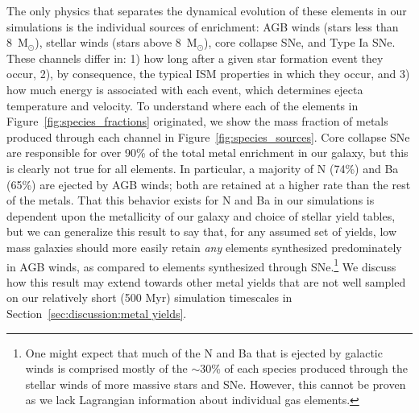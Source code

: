 \documentclass[twocolumn]{aastex61}
\begin{document}
The only physics that separates the dynamical evolution of these elements in our simulations is the individual sources of enrichment: AGB winds (stars less than 8~M$_{\odot}$), stellar winds (stars above 8~M$_{\odot}$), core collapse SNe, and Type Ia SNe. These channels differ in: 1) how long after a given star formation event they occur, 2), by consequence, the typical ISM properties in which they occur, and 3) how much energy is associated with each event, which determines ejecta temperature and velocity. To understand where each of the elements in Figure~\ref{fig:species_fractions} originated, we show the mass fraction of metals produced through each channel in Figure~\ref{fig:species_sources}. Core collapse SNe are responsible for over 90\% of the total metal enrichment in our galaxy, but this is clearly not true for all elements. In particular, a majority of N (74\%) and Ba (65\%) are ejected by AGB winds; both are retained at a higher rate than the rest of the metals. That this behavior exists for N and Ba in our simulations is dependent upon the metallicity of our galaxy and choice of stellar yield tables, but we can generalize this result to say that, for any assumed set of yields, low mass galaxies should more easily retain \textit{any} elements synthesized predominately in AGB winds, as compared to elements synthesized through SNe.\footnote{One might expect that much of the N and Ba that is ejected by galactic winds is comprised mostly of the $\sim$30\% of each species produced through the stellar winds of more massive stars and SNe. However, this cannot be proven as we lack Lagrangian information about individual gas elements.}
We discuss how this result may extend towards other metal yields that are not well sampled on our relatively short (500 Myr) simulation timescales in Section~\ref{sec:discussion:metal yields}.
\end{document}

